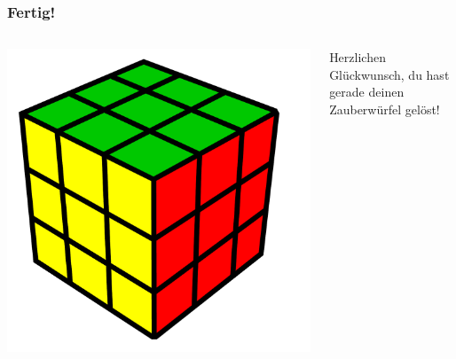 \begin{frame}
	\frametitle{Fertig!}
	
	\begin{columns}[c]
		\begin{column}[C]{.5\textwidth}
			\center
			\includegraphics[scale=0.3]{img/solved3}
		\end{column}
		\begin{column}[C]{.5\textwidth}
			Herzlichen Glückwunsch, du hast gerade deinen Zauberwürfel gelöst!
		\end{column}
	\end{columns}
	
\end{frame}

